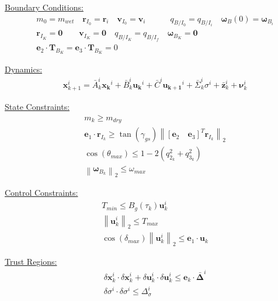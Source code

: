 \documentclass[conf]{new-aiaa}
\begin{document}
\begin{singlespace}
\begin{mdframed}
\underline{Boundary Conditions:}  
\begin{align*}
& m_0 = m_{wet} \quad \mathbf{r}_{I_0} = \mathbf{r}_i \quad \mathbf{v}_{I_0} = \mathbf{v}_i \quad \quad \quad{q}_{B/I_0} = {q}_{B/I _{i}} \quad \bm{\omega}_B(0) = \bm{\omega}_{B _{i}} \\
& \mathbf{r}_{I_K} = \mathbf{0} \quad \quad \mathbf{v}_{I_K} = \mathbf{0} \quad {q}_{B/I _K} = {q}_{B/I _ {f}} \quad \bm{\omega}_{B_K} = \mathbf{0} \\
& \mathbf{e}_2 \cdot \mathbf{T}_{B_K}= \mathbf{e}_3 \cdot \mathbf{T}_{B_K}= 0
\end{align*}

\underline{Dynamics:}  
\begin{align*}
& \mathbf{x}_{k+1}^i = \bar{A}_k^i\mathbf{x_k}^i + \bar{B}_k^i\mathbf{u_k}^i + \bar{C}^i\mathbf{u_{k+1}}^i + \bar{\Sigma}_k^i\sigma^i + \bar{\mathbf{z}}^i_k + \bm{\nu}_k^i
\end{align*}

\underline{State Constraints:}  
\begin{align*}
& m_k \geq m_{dry} \\
& \mathbf{e}_1 \cdot \mathbf{r}_{I_k} \geq \tan(\gamma_{gs}) \left\lVert \left[\mathbf{e}_2 \quad \mathbf{e}_3\right]^T \mathbf{r}_{I_k} \right\lVert_2 \\
& \cos(\theta_{max}) \leq 1-2(q_{2_k}^{2}+q_{3_k}^{2}) \\
& \left \lVert \bm{\omega}_{B_k} \right \lVert_2 \leq \omega_{max}
\end{align*}

\underline{Control Constraints:}  
\begin{align*}
& T_{min} \leq B_g(\tau_k)\mathbf{u}_k^i \\
& \left \lVert \mathbf{u}_k^i \right \lVert_2 \leq T_{max} \\
& \cos(\delta_{max}) \left \lVert \mathbf{u}_k^i \right \lVert_2 \leq \bm{e}_1 \cdot \mathbf{u}_k
\end{align*}

\underline{Trust Regions:}  
\begin{align*}
& \delta \mathbf{x}_k^i \cdot \delta \mathbf{x}_k^i + \delta \mathbf{u}_k^i \cdot \delta \mathbf{u}_k^i \leq \mathbf{e}_k \cdot \bm{\bar{\Delta}}^i \\
& \delta \sigma^i \cdot \delta \sigma^i \leq \Delta_\sigma^i
\end{align*}

\end{mdframed}




\end{singlespace}
\end{document}
